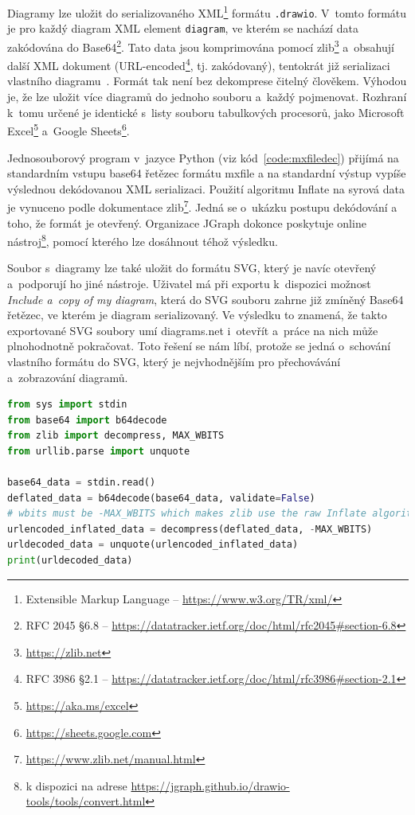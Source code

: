 Diagramy lze uložit do serializovaného XML\footnote{Extensible Markup Language -- \url{https://www.w3.org/TR/xml/}} formátu \texttt{.drawio}.
V~tomto formátu je pro každý diagram XML element \texttt{diagram}, ve kterém se nachází data zakódována do Base64\footnote{RFC 2045 \S6.8 -- \url{https://datatracker.ietf.org/doc/html/rfc2045\#section-6.8}}.
Tato data jsou komprimována pomocí zlib\footnote{\url{https://zlib.net}} a~obsahují další XML dokument (URL-encoded\footnote{RFC 3986 \S2.1 -- \url{https://datatracker.ietf.org/doc/html/rfc3986\#section-2.1}}, tj. zakódovaný), tentokrát již serializaci vlastního diagramu~\cite{seibert_extractingxml_2016}.
Formát tak není bez dekomprese čitelný člověkem.
Výhodou je, že lze uložit více diagramů do jednoho souboru a~každý pojmenovat.
Rozhraní k~tomu určené je identické s~listy souboru tabulkových procesorů, jako Microsoft Excel\footnote{\url{https://aka.ms/excel}} a~Google Sheets\footnote{\url{https://sheets.google.com}}.

Jednosouborový program v~jazyce Python (viz kód~\ref{code:mxfiledec}) přijímá na standardním vstupu base64 řetězec formátu mxfile a na standardní výstup vypíše výslednou dekódovanou XML serializaci.
Použití algoritmu Inflate na syrová data je vynuceno podle dokumentace zlib\footnote{\url{https://www.zlib.net/manual.html}}.
Jedná se o~ukázku postupu dekódování a toho, že formát je otevřený.
Organizace JGraph dokonce poskytuje online nástroj\footnote{k dispozici na adrese \url{https://jgraph.github.io/drawio-tools/tools/convert.html}}, pomocí kterého lze dosáhnout téhož výsledku.

Soubor s~diagramy lze také uložit do formátu SVG, který je navíc otevřený a~podporují ho jiné nástroje.
Uživatel má při exportu k~dispozici možnost \textit{Include a~copy of my diagram}, která do SVG souboru zahrne již zmíněný Base64 řetězec, ve kterém je diagram serializovaný.
Ve výsledku to znamená, že takto exportované SVG soubory umí diagrams.net i~otevřít a~práce na nich může plnohodnotně pokračovat.
Toto řešení se nám líbí, protože se jedná o~schování vlastního formátu do SVG, který je nejvhodnějším pro přechovávání a~zobrazování diagramů.

\begin{lstlisting}[language=Python, caption=Dekódování mxfile, label=code:mxfiledec, float=htb]
from sys import stdin
from base64 import b64decode
from zlib import decompress, MAX_WBITS
from urllib.parse import unquote

base64_data = stdin.read()
deflated_data = b64decode(base64_data, validate=False)
# wbits must be -MAX_WBITS which makes zlib use the raw Inflate algorithm without header detection
urlencoded_inflated_data = decompress(deflated_data, -MAX_WBITS)
urldecoded_data = unquote(urlencoded_inflated_data)
print(urldecoded_data)
\end{lstlisting}

